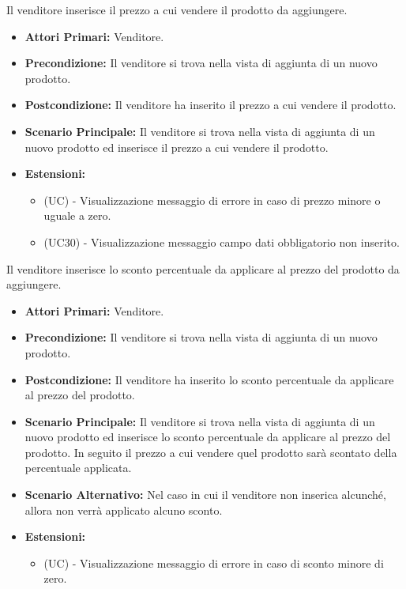 Il venditore inserisce il prezzo a cui vendere il prodotto da aggiungere.
\begin{itemize}
    \item \textbf{Attori Primari:} Venditore.
    \item \textbf{Precondizione:} Il venditore si trova nella vista di aggiunta di un nuovo prodotto.
    \item \textbf{Postcondizione:} Il venditore ha inserito il prezzo a cui vendere il prodotto.
    \item \textbf{Scenario Principale:} Il venditore si trova nella vista di aggiunta di un nuovo prodotto ed inserisce il prezzo a cui vendere il prodotto.
    \item \textbf{Estensioni:}
        \begin{itemize}
            \item (UC) - Visualizzazione messaggio di errore in caso di prezzo minore o uguale a zero.
            \item (UC30) - Visualizzazione messaggio campo dati obbligatorio non inserito.
        \end{itemize}
\end{itemize}

Il venditore inserisce lo sconto percentuale da applicare al prezzo del prodotto da aggiungere.
\begin{itemize}
    \item \textbf{Attori Primari:} Venditore.
    \item \textbf{Precondizione:} Il venditore si trova nella vista di aggiunta di un nuovo prodotto.
    \item \textbf{Postcondizione:} Il venditore ha inserito lo sconto percentuale da applicare al prezzo del prodotto.
    \item \textbf{Scenario Principale:} Il venditore si trova nella vista di aggiunta di un nuovo prodotto ed inserisce lo sconto percentuale da applicare al prezzo del prodotto. In seguito il prezzo a cui vendere quel prodotto sarà scontato della percentuale applicata.
    \item \textbf{Scenario Alternativo:} Nel caso in cui il venditore non inserica alcunché, allora non verrà applicato alcuno sconto. 
    \item \textbf{Estensioni:}
        \begin{itemize}
            \item (UC) - Visualizzazione messaggio di errore in caso di sconto minore di zero.
        \end{itemize}
\end{itemize}

